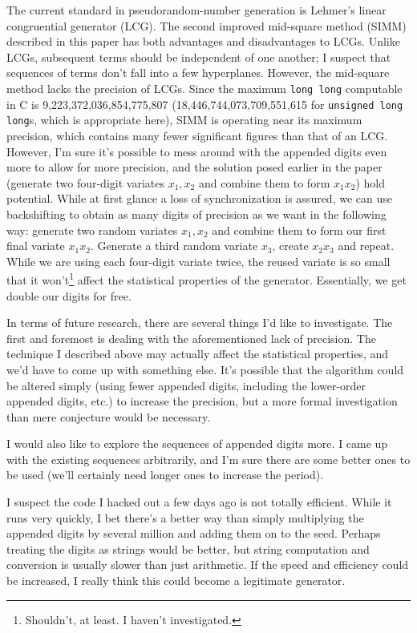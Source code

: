 \documentclass[11pt]{article}
\begin{document}
The current standard in pseudorandom-number generation is Lehmer's linear congruential generator (LCG).  The second improved mid-square method (SIMM) described in this paper has both advantages and disadvantages to LCGs.  Unlike LCGs, subsequent terms should be independent of one another; I suspect that sequences of terms don't fall into a few hyperplanes.  However, the mid-square method lacks the precision of LCGs.  Since the maximum \texttt{long long} computable in C is 9,223,372,036,854,775,807 (18,446,744,073,709,551,615 for \texttt{unsigned long long}s, which is appropriate here), SIMM is operating near its maximum precision, which contains many fewer significant figures than that of an LCG.  However, I'm sure it's possible to mess around with the appended digits even more to allow for more precision, and the solution posed earlier in the paper (generate two four-digit variates $x_1, x_2$ and combine them to form $x_1x_2$) hold potential.  While at first glance a loss of synchronization is assured, we can use backshifting to obtain as many digits of precision as we want in the following way: generate two random variates $x_1, x_2$ and combine them to form our first final variate $x_1x_2$.  Generate a third random variate $x_3$, create $x_2x_3$ and repeat.  While we are using each four-digit variate twice, the reused variate is so small that it won't\footnote{Shouldn't, at least. I haven't investigated.} affect the statistical properties of the generator.  Essentially, we get double our digits for free.

In terms of future research, there are several things I'd like to investigate.  The first and foremost is dealing with the aforementioned lack of precision.  The technique I described above may actually affect the statistical properties, and we'd have to come up with something else.  It's possible that the algorithm could be altered simply (using fewer appended digits, including the lower-order appended digits, etc.) to increase the precision, but a more formal investigation than mere conjecture would be necessary.

I would also like to explore the sequences of appended digits more.  I came up with the existing sequences arbitrarily, and I'm sure there are some better ones to be used (we'll certainly need longer ones to increase the period).

I suspect the code I hacked out a few days ago is not totally efficient.  While it runs very quickly, I bet there's a better way than simply multiplying the appended digits by several million and adding them on to the seed.  Perhaps treating the digits as strings would be better, but string computation and conversion is usually slower than just arithmetic.  If the speed and efficiency could be increased, I really think this could become a legitimate generator.
\end{document}
